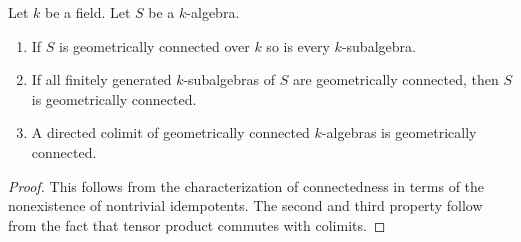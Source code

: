 \begin{lemma}
\label{lemma-subalgebra-geometrically-connected}
Let $k$ be a field. Let $S$ be a $k$-algebra.
\begin{enumerate}
\item If $S$ is geometrically connected over $k$ so is every
$k$-subalgebra.
\item If all finitely generated $k$-subalgebras of $S$ are
geometrically connected, then $S$ is geometrically connected.
\item A directed colimit of geometrically connected $k$-algebras
is geometrically connected.
\end{enumerate}
\end{lemma}

\begin{proof}
This follows from the characterization of connectedness in terms of the
nonexistence of nontrivial idempotents. The second and third property follow
from the fact that tensor product commutes with colimits.
\end{proof}
